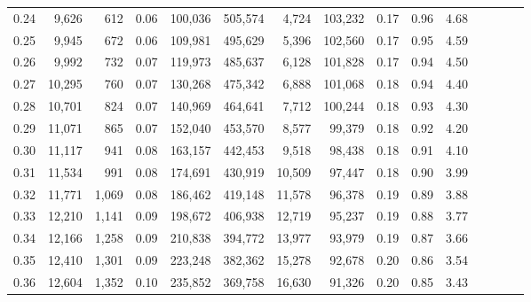 \begin{tabular}{rrrcrrrrrrrrrrr}
0.24 &   9,626 &    612 &                                       0.06 &  100,036 &  505,574 &    4,724 &  103,232 &  0.17 &  0.96 &                         4.68 \\
0.25 &   9,945 &    672 &                                       0.06 &  109,981 &  495,629 &    5,396 &  102,560 &  0.17 &  0.95 &                         4.59 \\
0.26 &   9,992 &    732 &                                       0.07 &  119,973 &  485,637 &    6,128 &  101,828 &  0.17 &  0.94 &                         4.50 \\
0.27 &  10,295 &    760 &                                       0.07 &  130,268 &  475,342 &    6,888 &  101,068 &  0.18 &  0.94 &                         4.40 \\
0.28 &  10,701 &    824 &                                       0.07 &  140,969 &  464,641 &    7,712 &  100,244 &  0.18 &  0.93 &                         4.30 \\
0.29 &  11,071 &    865 &                                       0.07 &  152,040 &  453,570 &    8,577 &   99,379 &  0.18 &  0.92 &                         4.20 \\
0.30 &  11,117 &    941 &                                       0.08 &  163,157 &  442,453 &    9,518 &   98,438 &  0.18 &  0.91 &                         4.10 \\
0.31 &  11,534 &    991 &                                       0.08 &  174,691 &  430,919 &   10,509 &   97,447 &  0.18 &  0.90 &                         3.99 \\
0.32 &  11,771 &  1,069 &                                       0.08 &  186,462 &  419,148 &   11,578 &   96,378 &  0.19 &  0.89 &                         3.88 \\
0.33 &  12,210 &  1,141 &                                       0.09 &  198,672 &  406,938 &   12,719 &   95,237 &  0.19 &  0.88 &                         3.77 \\
0.34 &  12,166 &  1,258 &                                       0.09 &  210,838 &  394,772 &   13,977 &   93,979 &  0.19 &  0.87 &                         3.66 \\
0.35 &  12,410 &  1,301 &                                       0.09 &  223,248 &  382,362 &   15,278 &   92,678 &  0.20 &  0.86 &                         3.54 \\
0.36 &  12,604 &  1,352 &                                       0.10 &  235,852 &  369,758 &   16,630 &   91,326 &  0.20 &  0.85 &                         3.43 \\

\end{tabular}
